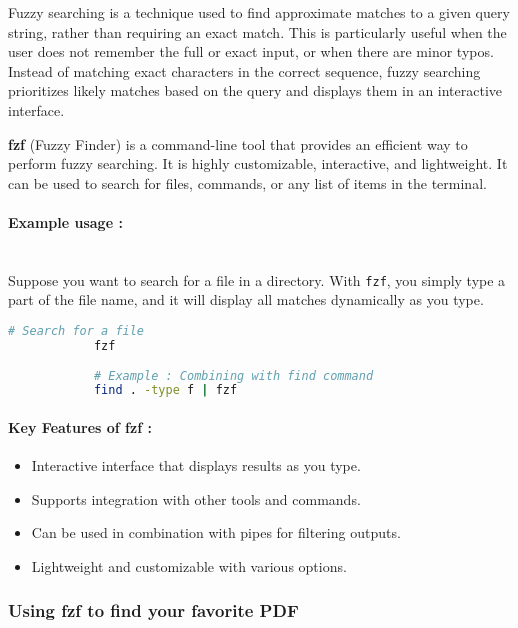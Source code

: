 \documentclass[12pt]{article}
\begin{document}
            Fuzzy searching is a technique used to find approximate matches to a given query string, rather than requiring an exact match. This is particularly useful when the user does not remember the full or exact input, or when there are minor typos. Instead of matching exact characters in the correct sequence, fuzzy searching prioritizes likely matches based on the query and displays them in an interactive interface.
            
            \textbf{fzf} (Fuzzy Finder) is a command-line tool that provides an efficient way to perform fuzzy searching. It is highly customizable, interactive, and lightweight. It can be used to search for files, commands, or any list of items in the terminal.
            
            \paragraph{Example usage :}\\
            Suppose you want to search for a file in a directory. With \texttt{fzf}, you simply type a part of the file name, and it will display all matches dynamically as you type.
            
            \begin{lstlisting}[language=bash]
            # Search for a file
            fzf
            
            # Example : Combining with find command
            find . -type f | fzf
            \end{lstlisting}
            
            \paragraph{Key Features of fzf :}
            \begin{itemize}
                \item Interactive interface that displays results as you type.
                \item Supports integration with other tools and commands.
                \item Can be used in combination with pipes for filtering outputs.
                \item Lightweight and customizable with various options.
            \end{itemize}
            
        \subsubsection{Using fzf to find your favorite PDF}
\end{document}
